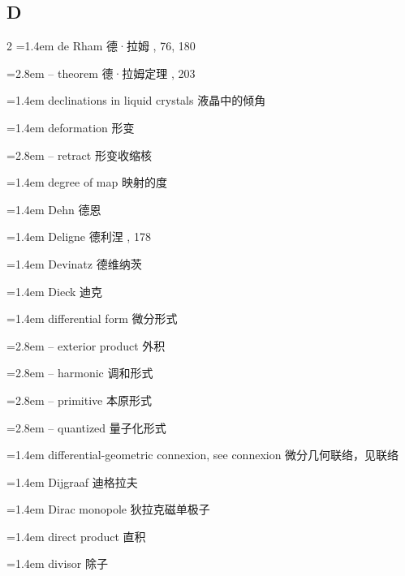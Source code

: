 \subsection*{D}
\small
\begin{multicols}{2}
\noindent\hangindent=1.4em de Rham \quad 德·拉姆 , 76, 180\par
\noindent\hangindent=2.8em -- theorem \quad 德·拉姆定理 , 203\par
\noindent\hangindent=1.4em declinations in liquid crystals \quad 液晶中的倾角 \par
\noindent\hangindent=1.4em deformation \quad 形变 \par
\noindent\hangindent=2.8em -- retract \quad 形变收缩核 \par
\noindent\hangindent=1.4em degree of map \quad 映射的度 \par
\noindent\hangindent=1.4em Dehn \quad 德恩 \par
\noindent\hangindent=1.4em Deligne \quad 德利涅 , 178\par
\noindent\hangindent=1.4em Devinatz \quad 德维纳茨 \par
\noindent\hangindent=1.4em Dieck \quad 迪克 \par
\noindent\hangindent=1.4em differential form \quad 微分形式 \par
\noindent\hangindent=2.8em -- exterior product \quad 外积 \par
\noindent\hangindent=2.8em -- harmonic \quad 调和形式 \par
\noindent\hangindent=2.8em -- primitive \quad 本原形式 \par
\noindent\hangindent=2.8em -- quantized \quad 量子化形式 \par
\noindent\hangindent=1.4em differential-geometric connexion, see connexion \quad 微分几何联络，见联络 \quad\par
\noindent\hangindent=1.4em Dijgraaf \quad 迪格拉夫 \par
\noindent\hangindent=1.4em Dirac monopole \quad 狄拉克磁单极子 \par
\noindent\hangindent=1.4em direct product \quad 直积 \par
\noindent\hangindent=1.4em divisor \quad 除子 \par

\end{multicols}
